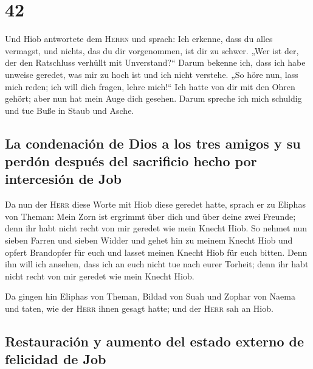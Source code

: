 \hypertarget{section-41}{%
\section{42}\label{section-41}}

 Und Hiob antwortete dem \textsc{Herrn} und sprach:
 Ich erkenne, dass du alles vermagst, und nichts, das du
dir vorgenommen, ist dir zu schwer.  „Wer ist der, der den
Ratschluss verhüllt mit Unverstand?{}`` Darum bekenne ich, dass ich habe
unweise geredet, was mir zu hoch ist und ich nicht verstehe.
 „So höre nun, lass mich reden; ich will dich fragen,
lehre mich!{}``  Ich hatte von dir mit den Ohren gehört;
aber nun hat mein Auge dich gesehen.  Darum spreche ich
mich schuldig und tue Buße in Staub und Asche.

\hypertarget{la-condenaciuxf3n-de-dios-a-los-tres-amigos-y-su-perduxf3n-despuuxe9s-del-sacrificio-hecho-por-intercesiuxf3n-de-job}{%
\subsection{La condenación de Dios a los tres amigos y su perdón después
del sacrificio hecho por intercesión de
Job}\label{la-condenaciuxf3n-de-dios-a-los-tres-amigos-y-su-perduxf3n-despuuxe9s-del-sacrificio-hecho-por-intercesiuxf3n-de-job}}

 Da nun der \textsc{Herr} diese Worte mit Hiob diese
geredet hatte, sprach er zu Eliphas von Theman: Mein Zorn ist ergrimmt
über dich und über deine zwei Freunde; denn ihr habt nicht recht von mir
geredet wie mein Knecht Hiob.  So nehmet nun sieben Farren
und sieben Widder und gehet hin zu meinem Knecht Hiob und opfert
Brandopfer für euch und lasset meinen Knecht Hiob für euch bitten. Denn
ihn will ich ansehen, dass ich an euch nicht tue nach eurer Torheit;
denn ihr habt nicht recht von mir geredet wie mein Knecht Hiob.

 Da gingen hin Eliphas von Theman, Bildad von Suah und
Zophar von Naema und taten, wie der \textsc{Herr} ihnen gesagt hatte;
und der \textsc{Herr} sah an Hiob.

\hypertarget{restauraciuxf3n-y-aumento-del-estado-externo-de-felicidad-de-job}{%
\subsection{Restauración y aumento del estado externo de felicidad de
Job}\label{restauraciuxf3n-y-aumento-del-estado-externo-de-felicidad-de-job}}

